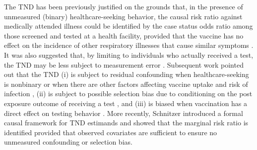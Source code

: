 \documentclass[11pt]{article}
\begin{document}
The TND has been previously justified on the grounds that, in the presence of unmeasured (binary) healthcare-seeking behavior, the causal risk ratio against medically attended illness could be identified by the case status odds ratio among those screened and tested at a health facility, provided that the vaccine has no effect on the incidence of other respiratory illnesses that cause similar symptoms \cite{jackson_test-negative_2013}. It was also suggested that, by limiting to individuals who actually received a test, the TND may be less subject to measurement error \cite{jackson_test-negative_2013}. Subsequent work pointed out that the TND (i) is subject to residual confounding when healthcare-seeking is nonbinary or when there are other factors affecting vaccine uptake and risk of infection \cite{sullivan_theoretical_2016,lewnard_theoretical_2021,lipsitch_observational_2016}, (ii) is subject to possible selection bias due to conditioning on the post exposure outcome of receiving a test \cite{sullivan_theoretical_2016,lipsitch_observational_2016}, and (iii) is biased when vaccination has a direct effect on testing behavior \cite{foppa_case_2013}. More recently, Schnitzer \cite{schnitzer_estimands_2022} introduced a formal causal framework for TND estimands and showed that the marginal risk ratio is identified provided that observed covariates are sufficient to ensure no unmeasured confounding or selection bias. 
\end{document}
